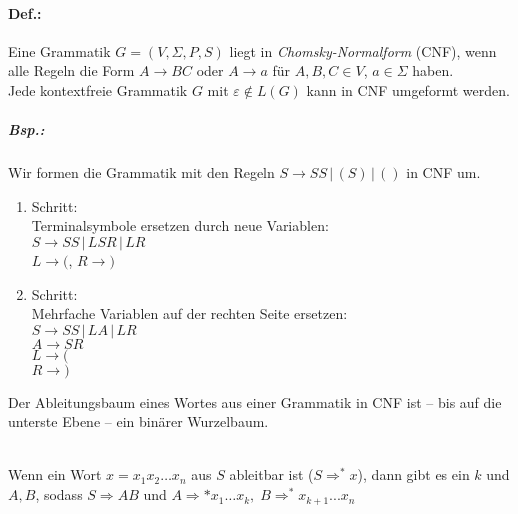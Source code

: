 \documentclass{scrreprt}
\begin{document}
\paragraph{Def.:} Eine Grammatik $G=(V,\Sigma, P, S)$ liegt in \emph{Chomsky-Normalform} (CNF), wenn alle Regeln die Form $A\to BC$ oder $A\to a$ für $A,B,C \in V$, $a \in \Sigma$ haben.\\
Jede kontextfreie Grammatik $G$ mit $\varepsilon \not \in L(G)$ kann in CNF umgeformt werden.
\subparagraph{Bsp.:} Wir formen die Grammatik  mit den Regeln $S\to SS \,|\, (S) \,|\, ()$ in CNF um.
\begin{enumerate}[label=\arabic*.]
\item Schritt:\\
Terminalsymbole ersetzen durch neue Variablen: \\
$S\to SS \,|\, LSR \,|\, LR$\\
$L\to ($, $R \to )$
\item Schritt:\\
Mehrfache Variablen auf der rechten Seite ersetzen:\\
$S\to SS \,|\, LA \,|\, LR$\\
$A \to SR$\\
$L\to ($\\
$R\to )$
\end{enumerate}
Der Ableitungsbaum eines Wortes aus einer Grammatik in CNF ist -- bis auf die unterste Ebene -- ein binärer Wurzelbaum.\\
\\
Wenn ein Wort $x=x_1x_2\dots x_n$ aus $S$ ableitbar ist ($S\Rightarrow^*x$), dann gibt es ein $ k $ und $ A,B $, sodass $ S\Rightarrow AB $ und $ A \Rightarrow* x_1\dots x_k , \; B\Rightarrow^*x_{k+1}...x_n $\\
\end{document}
